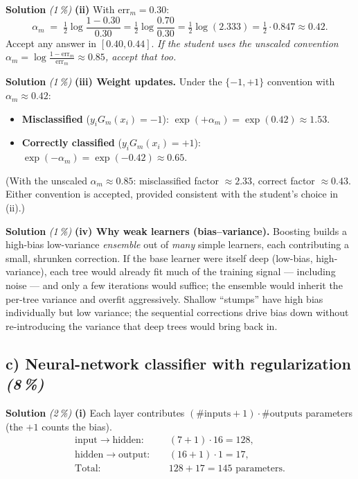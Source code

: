 \documentclass[11pt,a4paper]{article}
\newcommand{\subpoints}[1]{\textit{(#1\,\%)}}
\newcommand{\sol}{\noindent\textbf{Solution}}
\begin{document}
\medskip
\sol{} \subpoints{1} \textbf{(ii)} With $\mathrm{err}_m = 0.30$:
$$\alpha_m \;=\; \tfrac{1}{2}\log\frac{1-0.30}{0.30}
   = \tfrac{1}{2}\log\frac{0.70}{0.30}
   = \tfrac{1}{2}\log(2.333)
   = \tfrac{1}{2}\cdot 0.847
   \approx \boxed{0.42}.$$
Accept any answer in $[0.40, 0.44]$. \emph{If the student uses the unscaled convention $\alpha_m
=\log\tfrac{1-\mathrm{err}_m}{\mathrm{err}_m}\approx 0.85$, accept that too.}

\medskip
\sol{} \subpoints{1} \textbf{(iii) Weight updates.} Under the $\{-1,+1\}$ convention with
$\alpha_m\approx 0.42$:
\begin{itemize}
  \item \textbf{Misclassified} ($y_i G_m(x_i) = -1$): $\exp(+\alpha_m) = \exp(0.42)
        \approx \boxed{1.53}$.
  \item \textbf{Correctly classified} ($y_i G_m(x_i) = +1$): $\exp(-\alpha_m) = \exp(-0.42)
        \approx \boxed{0.65}$.
\end{itemize}
(With the unscaled $\alpha_m\approx 0.85$: misclassified factor $\approx 2.33$, correct factor
$\approx 0.43$. Either convention is accepted, provided consistent with the student's choice in
(ii).)

\medskip
\sol{} \subpoints{1} \textbf{(iv) Why weak learners (bias--variance).} Boosting builds a high-bias
low-variance \emph{ensemble} out of \emph{many} simple learners, each contributing a small,
shrunken correction. If the base learner were itself deep (low-bias, high-variance), each tree
would already fit much of the training signal --- including noise --- and only a few iterations
would suffice; the ensemble would inherit the per-tree variance and overfit aggressively. Shallow
``stumps'' have high bias individually but low variance; the sequential corrections drive bias
down without re-introducing the variance that deep trees would bring back in.

\subsection*{c) Neural-network classifier with regularization \subpoints{8}}

\sol{} \subpoints{2} \textbf{(i)} Each layer contributes $(\#\text{inputs} + 1)\cdot \#\text{outputs}$
parameters (the $+1$ counts the bias).
\begin{align*}
\text{input}\to\text{hidden}: & \quad (7+1)\cdot 16 = 128, \\
\text{hidden}\to\text{output}: & \quad (16+1)\cdot 1 = 17, \\
\text{Total:} & \quad \boxed{128 + 17 = 145} \text{ parameters.}
\end{align*}
\end{document}
